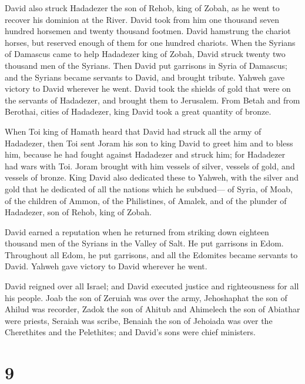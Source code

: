  David also struck Hadadezer the son of Rehob, king of
Zobah, as he went to recover his dominion at the River. 
David took from him one thousand seven hundred horsemen and twenty
thousand footmen. David hamstrung the chariot horses, but reserved
enough of them for one hundred chariots.  When the Syrians
of Damascus came to help Hadadezer king of Zobah, David struck twenty
two thousand men of the Syrians.  Then David put garrisons
in Syria of Damascus; and the Syrians became servants to David, and
brought tribute. Yahweh gave victory to David wherever he went.
 David took the shields of gold that were on the servants
of Hadadezer, and brought them to Jerusalem.  From Betah
and from Berothai, cities of Hadadezer, king David took a great quantity
of bronze.

 When Toi king of Hamath heard that David had struck all
the army of Hadadezer,  then Toi sent Joram his son to
king David to greet him and to bless him, because he had fought against
Hadadezer and struck him; for Hadadezer had wars with Toi. Joram brought
with him vessels of silver, vessels of gold, and vessels of bronze.
 King David also dedicated these to Yahweh, with the
silver and gold that he dedicated of all the nations which he subdued---
 of Syria, of Moab, of the children of Ammon, of the
Philistines, of Amalek, and of the plunder of Hadadezer, son of Rehob,
king of Zobah.

 David earned a reputation when he returned from striking
down eighteen thousand men of the Syrians in the Valley of Salt.
 He put garrisons in Edom. Throughout all Edom, he put
garrisons, and all the Edomites became servants to David. Yahweh gave
victory to David wherever he went.

 David reigned over all Israel; and David executed
justice and righteousness for all his people.  Joab the
son of Zeruiah was over the army, Jehoshaphat the son of Ahilud was
recorder,  Zadok the son of Ahitub and Ahimelech the son
of Abiathar were priests, Seraiah was scribe,  Benaiah
the son of Jehoiada was over the Cherethites and the Pelethites; and
David's sons were chief ministers.

\hypertarget{section-8}{%
\section{9}\label{section-8}}

